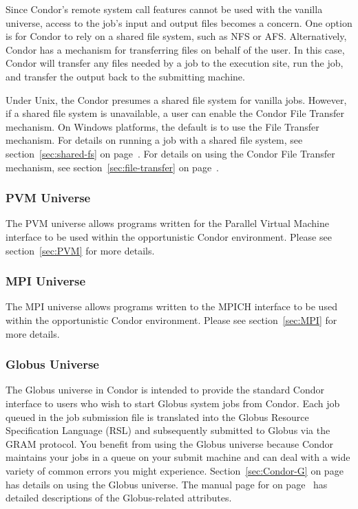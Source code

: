 Since Condor's remote system call features cannot be used with the
vanilla universe, access to the job's input and output files becomes a
concern.
One option is for Condor to rely on a shared file system, such as NFS
or AFS. 
Alternatively, Condor has a mechanism for transferring files on behalf
of the user.
In this case, Condor will transfer any files needed by a job to the
execution site, run the job, and transfer the output back to the
submitting machine.

Under Unix, the Condor presumes a shared file system for vanilla jobs. 
However, if a shared file system is unavailable, a user can enable the
Condor File Transfer mechanism.
On Windows platforms, the default is to use the File Transfer
mechanism.
For details on running a job with a shared file system, see
section~\ref{sec:shared-fs} on page~\pageref{sec:shared-fs}.
For details on using the Condor File Transfer mechanism, see 
section~\ref{sec:file-transfer} on page~\pageref{sec:file-transfer}.


\subsubsection{PVM Universe}

The PVM universe allows programs written for the Parallel Virtual Machine
interface to be used within the opportunistic Condor environment.
Please see section~\ref{sec:PVM} for more details.

\subsubsection{MPI Universe}
The MPI universe allows programs written to the MPICH
interface to be used within the opportunistic Condor environment.
Please see section~\ref{sec:MPI} for more details.

\subsubsection{Globus Universe}

The Globus universe in Condor is intended to provide the standard
Condor interface to users who wish to start Globus system jobs
from Condor. Each job queued in the job submission file is translated
into the Globus Resource Specification Language (RSL) and subsequently 
submitted to Globus via the GRAM
protocol. You benefit from using the Globus universe because Condor
maintains your jobs in a queue on your submit machine and can deal
with a wide variety of common errors you might
experience. Section~\ref{sec:Condor-G} on page~\pageref{sec:Condor-G}
has details on using the Globus universe.
The manual page for 
on page~\pageref{man-condor-submit}
has detailed descriptions of
the Globus-related attributes.

